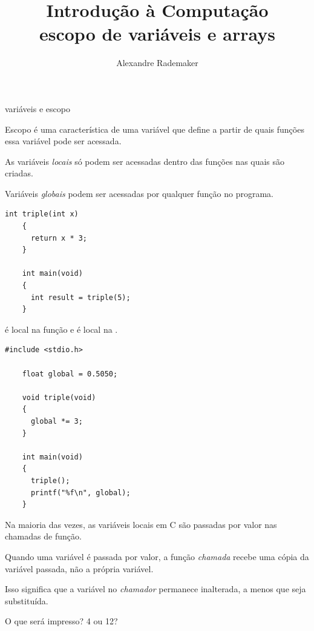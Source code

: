 \documentclass{beamer}
\title{Introdução à Computação \\ escopo de variáveis e  arrays}
\author{Alexandre Rademaker}
\date{}
\begin{document}
\begin{frame}
 \maketitle
\end{frame}


\begin{frame}{variáveis e escopo}

  Escopo é uma característica de uma variável que define a partir de
  quais funções essa variável pode ser acessada.
  
  As variáveis \emph{locais} só podem ser acessadas dentro das funções nas
  quais são criadas.

  Variáveis \emph{globais} podem ser acessadas por qualquer função no
  programa.

  \framebreak

  \begin{lstlisting}[style=normalc]
    int triple(int x)
    {
      return x * 3;
    }
    
    int main(void)
    {
      int result = triple(5);
    }

  \end{lstlisting}

   é local na função  e  é
  local na .

  \framebreak

  \begin{lstlisting}[style=normalc]
    #include <stdio.h>
    
    float global = 0.5050;

    void triple(void)
    {
      global *= 3;
    }
    
    int main(void)
    {
      triple();
      printf("%f\n", global);
    }
  \end{lstlisting}

  \framebreak

  Na maioria das vezes, as variáveis locais em C são passadas por
  valor nas chamadas de função.
  
  Quando uma variável é passada por valor, a função \emph{chamada}
  recebe uma cópia da variável passada, não a própria variável.

  Isso significa que a variável no \emph{chamador} permanece
  inalterada, a menos que seja substituída.

  \framebreak
  
  O que será impresso? 4 ou 12?
  

\end{frame}
\end{document}
